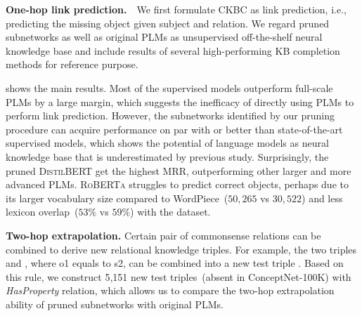 %

\textbf{One-hop link prediction.}~~We first formulate CKBC as link prediction, i.e., predicting the missing object given subject and relation. We regard pruned subnetworks as well as original PLMs as unsupervised off-the-shelf neural knowledge base and include results of several high-performing KB completion methods for reference purpose.


 shows the main results. Most of the supervised 
models outperform full-scale PLMs by a large margin, which suggests the 
inefficacy of directly using PLMs to perform link prediction. However, 
the subnetworks identified by our pruning procedure can
acquire performance on par with or better than state-of-the-art 
supervised models, which shows the potential of language models as neural knowledge base that is underestimated by previous study. Surprisingly, the pruned \textsc{DistilBERT} get the 
highest MRR, outperforming other larger and more advanced PLMs. 
\textsc{RoBERTa} struggles to predict correct objects, perhaps due to 
its larger vocabulary size compared to WordPiece~($50,265$ vs $30,522$) 
and less lexicon overlap~($53\%$ vs $59\%$) with the dataset.




\textbf{Two-hop extrapolation.} Certain pair of commonsense relations can be combined to derive new relational knowledge triples. For example, the two triples  and , where o1 equals to s2, can be combined into a new test triple . Based on this rule, we construct 5,151 new test triples~(absent in ConceptNet-100K) with \textit{HasProperty} relation, which allows us to compare the two-hop extrapolation ability of pruned subnetworks with original PLMs.

